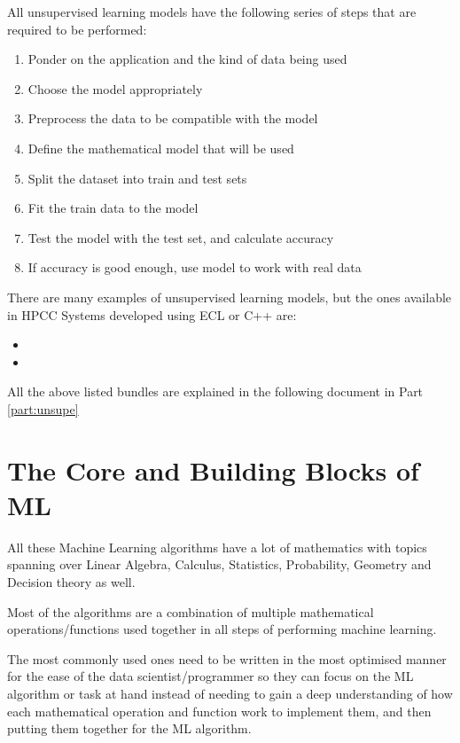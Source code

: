 \documentclass[a4paper,oneside,12pt]{book}
\begin{document}
All unsupervised learning models have the following series of steps that are required to be performed:

\begin{enumerate}
    \item Ponder on the application and the kind of data being used
    \item Choose the model appropriately
    \item Preprocess the data to be compatible with the model
    \item Define the mathematical model that will be used
    \item Split the dataset into train and test sets
    \item Fit the train data to the model
    \item Test the model with the test set, and calculate accuracy
    \item If accuracy is good enough, use model to work with real data
\end{enumerate}

There are many examples of unsupervised learning models, but the ones available in HPCC Systems developed using ECL or C++ are:

\begin{itemize}
    \item {}
    \item {}
\end{itemize}

All the above listed bundles are explained in the following document in Part \ref{part:unsupe}

\chapter{The Core and Building Blocks of ML}\label{chap:coreml}

All these Machine Learning algorithms have a lot of mathematics with topics spanning over Linear Algebra, Calculus, Statistics, Probability, Geometry and Decision theory as well. 

Most of the algorithms are a combination of multiple mathematical operations/functions used together in all steps of performing machine learning. 

The most commonly used ones need to be written in the most optimised manner for the ease of the data scientist/programmer so they can focus on the ML algorithm or task at hand instead of needing to gain a deep understanding of how each mathematical operation and function work to implement them, and then putting them together for the ML algorithm.
\end{document}

